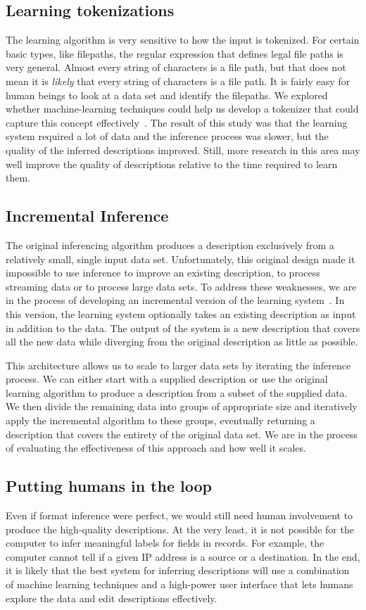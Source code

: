 \documentclass{sig-alternate}
\begin{document}
\subsection{Learning tokenizations}
The learning algorithm is very sensitive to how the input is
tokenized.  For certain basic types, like filepaths, the regular
expression that defines legal file paths is very general.  Almost
every string of characters is a file path, but that does not mean it
is \textit{likely} that every string of characters is a file path.  It
is fairly easy for human beings to look at a data set and identify the
filepaths.  We explored whether machine-learning techniques could help
us develop a tokenizer that could capture this concept 
effectively~\cite{Xi+:padl}. The result of this study was that the
learning system required a lot of data and the inference process was
slower, but the quality of the inferred descriptions improved.  Still,
more research in this area may well improve the quality of descriptions
relative to the time required to learn them.

\subsection{Incremental Inference}
The original inferencing algorithm produces a description exclusively
from a relatively small, single input data set.  Unfortunately,
this original design made it impossible to use inference
to improve an existing description, to process streaming data
or to process large data sets.  To address these weaknesses, we
are in the process of developing an incremental version of the
learning system~\cite{Zhu+:wasl}.  In this version, the learning system optionally
takes an existing description as input in addition to the data.
The output of the system is a new description that covers all the new
data while diverging from the original description as little as
possible.  

This architecture allows us to scale to larger data sets by
iterating the inference process.  We can either start with a supplied
description or use the original learning algorithm to produce a
description from a subset of the supplied data.  We then divide the
remaining data into groups of appropriate size and iteratively apply
the incremental algorithm to these groups, eventually returning a
description that covers the entirety of the original data set.
We are in the process of evaluating the effectiveness of this approach
and how well it scales.

\subsection{Putting humans in the loop}
Even if format inference were perfect, we would still need human
involvement to produce the high-quality descriptions.  At the very least, it
is not possible for the computer to infer meaningful labels for fields
in records.  For example, the computer cannot tell if a given IP
address is a source or a destination.  In the end, it is likely that the
best system for inferring descriptions will use a combination of
machine learning techniques and a high-power user interface that lets
humans explore the data and edit descriptions effectively.
\end{document}
